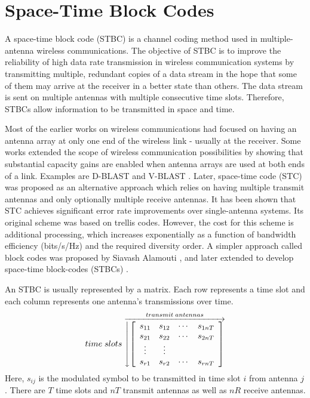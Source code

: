 \documentclass{book}
\begin{document}
\section{Space-Time Block Codes}
A space-time block code (STBC) is a channel coding method used in multiple-antenna wireless communications. The objective of STBC is to improve the reliability of high data rate transmission in wireless communication systems by transmitting multiple, redundant copies of a data stream in the hope that some of them may arrive at the receiver in a better state than others. The data stream is sent on multiple antennas with multiple consecutive time slots. Therefore, STBCs allow information to be transmitted in space and time.

Most of the earlier works on wireless communications had focused on having an antenna array at only one end of the wireless link - usually at the receiver. Some works extended the scope of wireless communication possibilities by showing that substantial capacity gains are enabled when antenna arrays are used at both ends of a link. Examples are D-BLAST \cite{15} and V-BLAST \cite{16}. Later, space-time code \cite{5} (STC) was proposed as an alternative approach which relies on having multiple transmit antennas and only optionally multiple receive antennas. It has been shown that STC achieves significant error rate improvements over single-antenna systems. Its original scheme was based on trellis codes. However, the cost for this scheme is additional processing, which increases exponentially as a function of bandwidth efficiency (bits/s/Hz) and the required diversity order. A simpler approach called block codes was proposed by Siavash Alamouti \cite{11}, and later extended to develop space-time block-codes (STBCs) \cite{17}.

An STBC is usually represented by a matrix. Each row represents a time slot and each column represents one antenna's transmissions over time.
\[
time\;slots
\stackrel{transmit\;antennas} {
\overrightarrow{
\left\downarrow
\left[
 \begin{array}{cccc}
 s_{11} & s_{12} & \cdots & s_{1nT}\\
 s_{21} & s_{22} & \cdots & s_{2nT}\\
 \vdots & \vdots\\
 s_{r1} & s_{r2} & \cdots & s_{rnT}\\
 \end{array} \right]
\right.
}
}
\]
Here, $s_{ij}$ is the modulated symbol to be transmitted in time slot $i$ from antenna $j$. There are $T$ time slots and $nT$ transmit antennas as well as $nR$ receive antennas.
\end{document}
